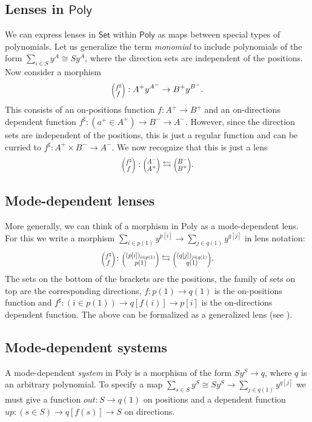 \documentclass[12pt, a4paper]{article}
\theoremstyle{definition}
\theoremstyle{plain}
\theoremstyle{plain}
\theoremstyle{plain}
\theoremstyle{plain}
\theoremstyle{plain}
\theoremstyle{remark}
\theoremstyle{remark}
\newcommand{\lens}[2]{\scaleobj{0.6}{\begin{pmatrix} \scaleobj{1.3}{{#1}} \\ \scaleobj{1.3}{{#2}} \end{pmatrix}}}
\begin{document}
\subsection{Lenses in $\mathsf{Poly}$}
We can express lenses in $\mathsf{Set}$ within $\mathsf{Poly}$ as maps between special types of polynomials. Let us generalize the term \emph{monomial} to include polynomials of the form $\sum_{i \in S} y^{A} \cong S y^A$, where the direction sets are independent of the positions. Now consider a morphism
$$\lens{f^\sharp}{f} :A^+ y^{A^-} \rightarrow B^+ y^{B^-} .$$
This consists of an on-positions function $f: A^+ \rightarrow B^+$ and an on-directions dependent function $f^\sharp : (a^+ \in A^+) \rightarrow B^- \rightarrow A^-$. However, since the direction sets are independent of the positions, this is just a regular function and can be curried to $f^\sharp: A^+ \times B^- \rightarrow A^-$. We now recognize that this is just a lens
$$\lens{f^\sharp}{f} : \lens{A^-}{A^+} \leftrightarrows \lens{B^-}{B^+}.$$

\subsection{Mode-dependent lenses}
More generally, we can think of a morphism in \textsf{Poly} as a mode-dependent lens. For this we write a morphism $\sum_{i \in p(1)} y^{p[i]} \rightarrow \sum_{j \in q(1)} y^{q[j]}$ in lens notation:
$$\lens{f^\sharp}{f} \colon \lens{(p[i])_{i \in p(1)}}{p(1)} \leftrightarrows \lens{(q[j])_{j \in q(1)}}{q(1)}. $$
The sets on the bottom of the brackets are the positions, the family of sets on top are the corresponding directions, $f \colon p(1) \rightarrow q(1)$ is the on-positions function and $f^\sharp \colon (i \in p(1)) \rightarrow q[f(i)] \rightarrow p[i]$ is the on-directions dependent function. The above can be formalized as a generalized lens (see \cite[Chapter 2.6]{cat_sys_book}).

\subsection{Mode-dependent systems}
A mode-dependent \emph{system} in \textsf{Poly} is a morphism of the form $S y^S \rightarrow q$, where $q$ is an arbitrary polynomial. To specify a map $\sum_{s \in S} y^S \cong S y^S \rightarrow \sum_{j \in q(1)} y^{q[j]}$ we must give a function $out: S \rightarrow q(1)$ on positions and a dependent function $up: (s \in S) \rightarrow q[f(s)] \rightarrow S$ on directions.
\end{document}
